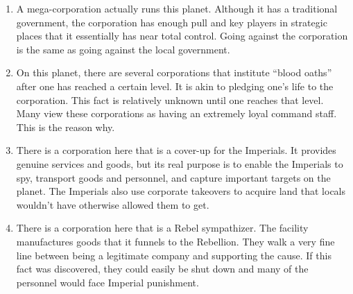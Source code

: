 \documentclass{article}
\begin{document}
\begin{enumerate}
	\item A mega-corporation actually runs this planet. Although it has a traditional government, the corporation has enough pull and key players in strategic places that it essentially has near total control. Going against the corporation is the same as going against the local government.
	\item On this planet, there are several corporations that institute “blood oaths” after one has reached a certain level. It is akin to pledging one’s life to the corporation. This fact is relatively unknown until one reaches that level. Many view these corporations as having an extremely loyal command staff. This is the reason why.
	\item There is a corporation here that is a cover-up for the Imperials. It provides genuine services and goods, but its real purpose is to enable the Imperials to spy, transport goods and personnel, and capture important targets on the planet. The Imperials also use corporate takeovers to acquire land that locals wouldn’t have otherwise allowed them to get.
	\item There is a corporation here that is a Rebel sympathizer. The facility manufactures goods that it funnels to the Rebellion. They walk a very fine line between being a legitimate company and supporting the cause. If this fact was discovered, they could easily be shut down and many of the personnel would face Imperial punishment.
\end{enumerate}
\end{document}

